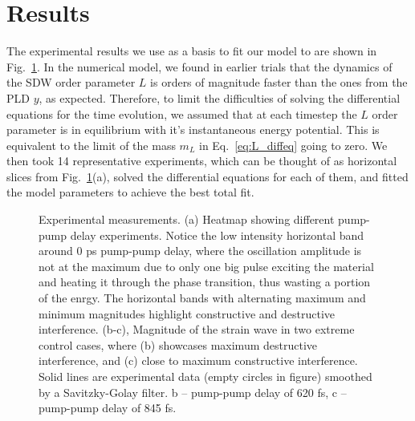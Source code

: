 \section{Results}
The experimental results we use as a basis to fit our model to are shown in Fig.~\ref{fig:Cr_experimental}. In the numerical model, we found in earlier trials that the dynamics of the SDW order parameter $L$ is orders of magnitude faster than the ones from the PLD $y$, as expected. Therefore, to limit the difficulties of solving the differential equations for the time evolution, we assumed that at each timestep the $L$ order parameter is in equilibrium with it's instantaneous energy potential. This is equivalent to the limit of the mass $m_L$ in Eq.~\ref{eq:L_diffeq} going to zero. We then took 14 representative experiments, which can be thought of as horizontal slices from Fig.~\ref{fig:Cr_experimental}(a), solved the differential equations for each of them, and fitted the model parameters to achieve the best total fit.       

\begin{figure}
\caption{\label{fig:Cr_experimental}Experimental measurements. (a) Heatmap showing different pump-pump delay experiments. Notice the low intensity horizontal band around 0 ps pump-pump delay, where the oscillation amplitude is not at the maximum due to only one big pulse exciting the material and heating it through the phase transition, thus wasting a portion of the enrgy. The horizontal bands with alternating maximum and minimum magnitudes highlight constructive and destructive interference. (b-c), Magnitude of the strain wave in two extreme control cases, where (b) showcases maximum destructive interference, and (c) close to maximum constructive interference. Solid lines are experimental data (empty circles in figure) smoothed by a Savitzky-Golay filter.  b – pump-pump delay of 620 fs, c – pump-pump delay of 845 fs.}
\end{figure}

